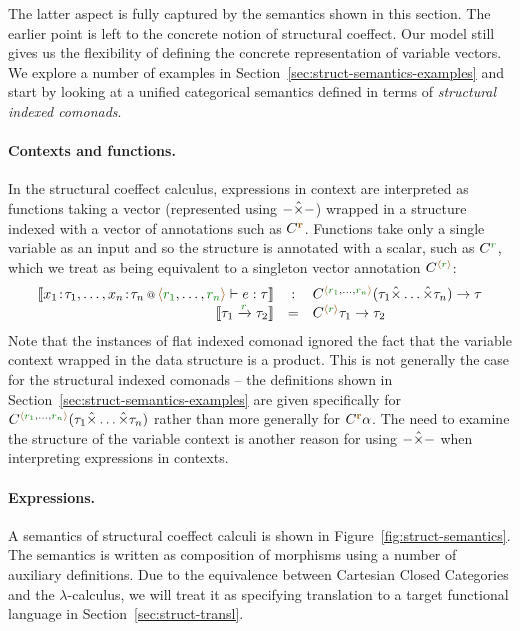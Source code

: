 The latter aspect is fully captured by the semantics shown in this section. The
earlier point is left to the concrete notion of structural coeffect. Our model still gives
us the flexibility of defining the concrete representation of variable vectors. We explore
a number of examples in Section~\ref{sec:struct-semantics-examples} and start by looking
at a unified categorical semantics defined in terms of \emph{structural indexed comonads}.

\paragraph{Contexts and functions.}
In the structural coeffect calculus, expressions in context are interpreted as functions taking
a vector (represented using $-\hat{\times}-$) wrapped in a structure indexed with a vector of annotations
such as $\ctyp{\aclrd{\textbf{r}}}$. Functions take only a single variable as an input and so the
structure is annotated with a scalar, such as $\ctyp{\cclrd{r}}$, which we treat as being equivalent
to a singleton vector annotation $\ctyp{\alift{\cclrd{r}}}$:
%
\begin{equation*}
\begin{array}{rcl}
\sem{\coctx{x_1\!:\!\tau_1, \ldots, x_n\!:\!\tau_n}{ \alift{\cclrd{r_1}, \ldots, \cclrd{r_n}} } \vdash e : \tau}
  &:& \ctyp{ \alift{\cclrd{r_1}, \ldots, \cclrd{r_n}} }{(\tau_1 \xtimes \ldots \xtimes \tau_n)} \rightarrow \tau\\
\sem{\tau_1 \xrightarrow{\cclrd{r}} \tau_2} &=& \ctyp{\alift{\cclrd{r}}}{\tau_1} \rightarrow \tau_2
\end{array}
\end{equation*}
%
Note that the instances of flat indexed comonad ignored the fact that the variable
context wrapped in the data structure is a product. This is not generally the case for the
structural indexed comonads -- the definitions shown in Section~\ref{sec:struct-semantics-examples}
are given specifically for $\ctyp{ \alift{\cclrd{r_1}, \ldots, \cclrd{r_n}} }{(\tau_1 \xtimes \ldots \xtimes \tau_n)}$
rather than more generally for $\ctyp{\aclrd{\textbf{r}}}{\alpha}$. The need to examine the structure
of the variable context is another reason for using $-\hat{\times}-$ when interpreting expressions in contexts.

\paragraph{Expressions.}
A semantics of structural coeffect calculi is shown in Figure~\ref{fig:struct-semantics}. The
semantics is written as composition of morphisms using a number of auxiliary definitions. Due to
the equivalence between Cartesian Closed Categories and the $\lambda$-calculus, we will treat it
as specifying translation to a target functional language in Section~\ref{sec:struct-transl}.

